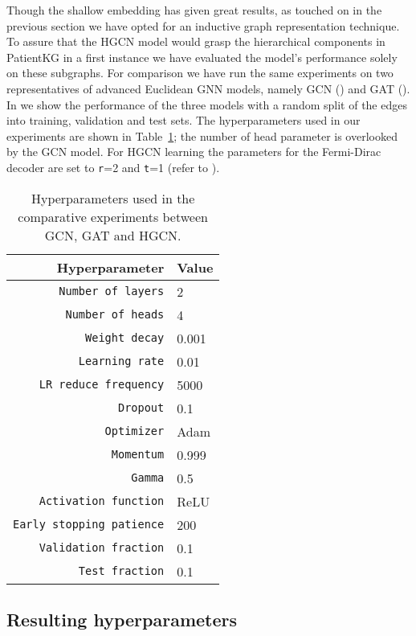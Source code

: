 Though the shallow embedding has given great results, as touched on in the previous section we have opted for an inductive graph representation technique. To assure that the HGCN model would grasp the hierarchical components in PatientKG in a first instance we have evaluated the model's performance solely on these subgraphs. For comparison we have run the same experiments on two representatives of advanced Euclidean GNN models, namely GCN () and GAT (). In  we show the performance of the three models with a random split of the edges into training, validation and test sets. The hyperparameters used in our experiments are shown in Table~\ref{tab:hyperparams}; the number of head parameter is overlooked by the GCN model. For HGCN learning the parameters for the Fermi-Dirac decoder are set to \texttt{r}=2 and \texttt{t}=1 (refer to ).
\begin{table}[ht]
\centering
\caption{Hyperparameters used in the comparative experiments between GCN, GAT and HGCN.}
\label{tab:hyperparams}
\begin{tabular}{rl}
\hline
\textbf{Hyperparameter} & \textbf{Value} \\
\hline
\texttt{Number of layers} & 2 \\
\texttt{Number of heads} &  4 \\
\texttt{Weight decay} & 0.001 \\
\texttt{Learning rate} & 0.01 \\
\texttt{LR reduce frequency} & 5000 \\
\texttt{Dropout} & 0.1 \\
\texttt{Optimizer} & Adam \\
\texttt{Momentum} & 0.999 \\
\texttt{Gamma} & 0.5 \\
\texttt{Activation function} & ReLU \\
\texttt{Early stopping patience} & 200 \\
\texttt{Validation fraction} & 0.1 \\
\texttt{Test fraction} & 0.1 \\

\hline
\end{tabular}
\end{table}


\subsection{Resulting hyperparameters}

